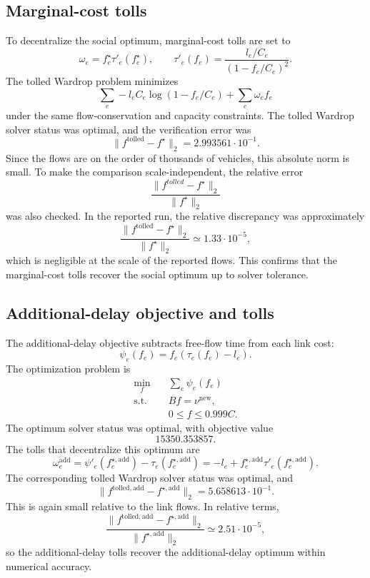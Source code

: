 \documentclass[11pt,a4paper]{article}
\begin{document}
\subsection*{Marginal-cost tolls}

To decentralize the social optimum, marginal-cost tolls are set to
\[
\omega_e=f^{\star}_e \tau'_e(f^{\star}_e),
\qquad
\tau'_e(f_e)=\frac{l_e/C_e}{(1-f_e/C_e)^2}.
\]
The tolled Wardrop problem minimizes
\[
\sum_e -l_e C_e\log(1-f_e/C_e)+\sum_e \omega_e f_e
\]
under the same flow-conservation and capacity constraints. The tolled Wardrop
solver status was \(\mathrm{optimal}\), and the verification error was
\[
\|f^{\mathrm{tolled}}-f^\star\|_2=2.993561\cdot 10^{-1}.
\]
Since the flows are on the order of thousands of vehicles, this absolute norm is
small. To make the comparison scale-independent, the relative error
\[
\frac{\|f^{tolled}-f^\star\|_2}{\|f^\star\|_2}
\]
was also checked. In the reported run, the relative discrepancy was approximately
\[
\frac{\|f^{\mathrm{tolled}}-f^\star\|_2}{\|f^\star\|_2}
\simeq 1.33\cdot 10^{-5},
\]
which is negligible at the scale of the reported flows. This confirms that the marginal-cost tolls recover the social optimum up to solver tolerance. 
\subsection*{Additional-delay objective and tolls}

The additional-delay objective subtracts free-flow time from each link cost:
\[
\psi_e(f_e)=f_e(\tau_e(f_e)-l_e).
\]
The optimization problem is
\[
\begin{aligned}
\min_f \quad & \sum_e \psi_e(f_e)\\
\text{s.t.}\quad & Bf=\nu^{\mathrm{new}},\\
&0\leq f\leq 0.999C .
\end{aligned}
\]
The optimum solver status was \(\mathrm{optimal}\), with objective value
\[
15350.353857.
\]
The tolls that decentralize this optimum are
\[
\omega^{\mathrm{add}}_e
=\psi'_e(f^{\star,\mathrm{add}}_e)-\tau_e(f^{\star,\mathrm{add}}_e)
=-l_e+f^{\star,\mathrm{add}}_e\tau'_e(f^{\star,\mathrm{add}}_e).
\]
The corresponding tolled Wardrop solver status was \(\mathrm{optimal}\), and
\[
\|f^{\mathrm{tolled,add}}-f^{\star,\mathrm{add}}\|_2
=5.658613\cdot 10^{-1}.
\]
This is again small relative to the link flows. In relative terms,
\[
\frac{\|f^{\mathrm{tolled,add}}-f^{\star,\mathrm{add}}\|_2}{\|f^{\star,\mathrm{add}}\|_2}
\simeq 2.51\cdot 10^{-5},
\]
so the additional-delay tolls recover the additional-delay optimum within numerical accuracy.
\end{document}
